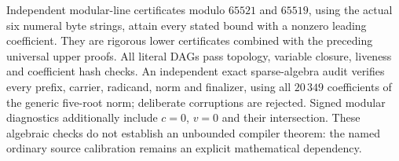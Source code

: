 Independent modular-line certificates modulo $65521$ and $65519$, using
the actual six numeral byte strings, attain every stated bound with a
nonzero leading coefficient. They are rigorous lower certificates
combined with the preceding universal upper proofs.
All literal DAGs pass topology, variable closure, liveness and coefficient
hash checks. An independent exact sparse-algebra audit verifies every
prefix, carrier, radicand, norm and finalizer, using all $20\,349$
coefficients of the generic five-root norm; deliberate corruptions are
rejected. Signed modular diagnostics additionally include $c=0$, $v=0$
and their intersection. These algebraic checks do not establish an
unbounded compiler theorem: the named ordinary source calibration remains
an explicit mathematical dependency.
